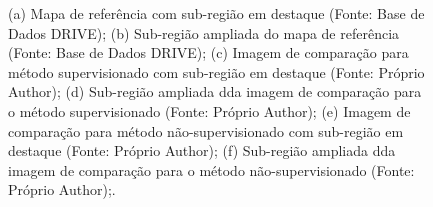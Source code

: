 \begin{figure}[!h]
    \caption{(a) Mapa de refer\^{e}ncia com sub-regi\~{a}o em destaque (Fonte: Base de Dados DRIVE); (b) Sub-regi\~{a}o ampliada do mapa de refer\^{e}ncia (Fonte: Base de Dados DRIVE); (c) Imagem de compara\c{c}\~{a}o para m\'{e}todo supervisionado com sub-regi\~{a}o em destaque (Fonte: Pr\'{o}prio Author); (d) Sub-regi\~{a}o ampliada dda imagem de compara\c{c}\~{a}o para o m\'{e}todo supervisionado (Fonte: Pr\'{o}prio Author); (e) Imagem de compara\c{c}\~{a}o para m\'{e}todo n\~{a}o-supervisionado com sub-regi\~{a}o em destaque (Fonte: Pr\'{o}prio Author); (f) Sub-regi\~{a}o ampliada dda imagem de compara\c{c}\~{a}o para o m\'{e}todo n\~{a}o-supervisionado (Fonte: Pr\'{o}prio Author);.}
    \label{Fig:exemplesConDrive}
\end{figure}


